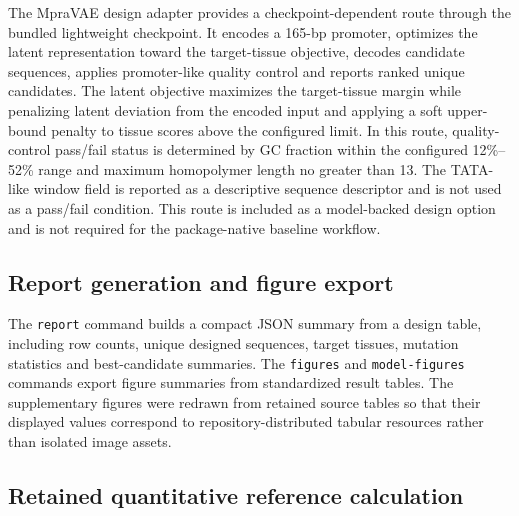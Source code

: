 \documentclass[10pt]{article}
\begin{document}
The MpraVAE design adapter provides a checkpoint-dependent route through the bundled lightweight checkpoint. It encodes a 165-bp promoter, optimizes the latent representation toward the target-tissue objective, decodes candidate sequences, applies promoter-like quality control and reports ranked unique candidates. The latent objective maximizes the target-tissue margin while penalizing latent deviation from the encoded input and applying a soft upper-bound penalty to tissue scores above the configured limit. In this route, quality-control pass/fail status is determined by GC fraction within the configured 12\%--52\% range and maximum homopolymer length no greater than 13. The TATA-like window field is reported as a descriptive sequence descriptor and is not used as a pass/fail condition. This route is included as a model-backed design option and is not required for the package-native baseline workflow.

\subsection{Report generation and figure export}

The \texttt{report} command builds a compact JSON summary from a design table, including row counts, unique designed sequences, target tissues, mutation statistics and best-candidate summaries. The \texttt{figures} and \texttt{model-figures} commands export figure summaries from standardized result tables. The supplementary figures were redrawn from retained source tables so that their displayed values correspond to repository-distributed tabular resources rather than isolated image assets.

\subsection{Retained quantitative reference calculation}
\end{document}
